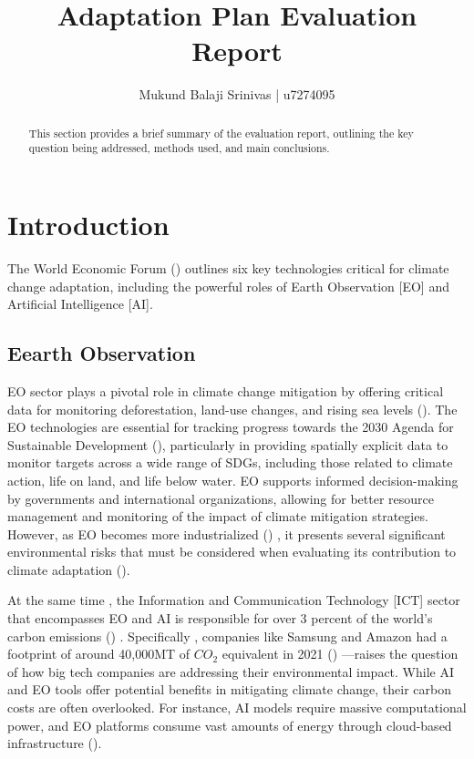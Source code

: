\documentclass[12pt]{article}
\title{Adaptation Plan Evaluation Report}
\author{Mukund Balaji Srinivas | u7274095}
\date{} %
\begin{document}
\maketitle

\begin{abstract}
This section provides a brief summary of the evaluation report, outlining the key question being addressed, methods used, and main conclusions.
\end{abstract}

\newpage

\section*{Introduction}

The World Economic Forum (\cite{masterson_2024})  outlines six key technologies critical for climate change adaptation, 
including the powerful roles of Earth Observation [EO] and Artificial Intelligence [AI]. 


\subsection*{Eearth Observation}
EO sector plays a pivotal role in climate change mitigation by offering critical data for monitoring deforestation, land-use changes, and rising sea levels (\cite{anderson_2017}). 
The EO technologies are essential for tracking progress towards the 2030 Agenda for Sustainable Development (\cite{unitednations_2015}), particularly in providing spatially explicit data to monitor targets across 
a wide range of SDGs, including those related to climate action, life on land, and life below water. EO supports informed decision-making by governments and international 
organizations, allowing for better resource management and monitoring of the impact of climate mitigation strategies.
However, as EO becomes more industrialized (\cite{venkatesan_2020}) , it presents several significant environmental risks that must be considered when evaluating its contribution to climate adaptation (\cite{crisp_2020}).

At the same time , the  Information and Communication Technology [ICT] sector that encompasses EO and AI
is responsible for over 3 percent of the world's carbon emissions (\cite{jones_2018}) . Specifically , 
companies like Samsung and Amazon had a footprint of around 40,000MT of \(CO_2\) equivalent in 2021 (\cite{navarro_2023_the}) —raises the question 
of how big tech companies are addressing their environmental impact. While AI and EO tools offer potential benefits in 
mitigating climate change, their carbon costs are often overlooked. For instance, AI models require massive computational power, 
and EO platforms consume vast amounts of energy through cloud-based infrastructure (\cite{taddeo_2021}).
\end{document}
